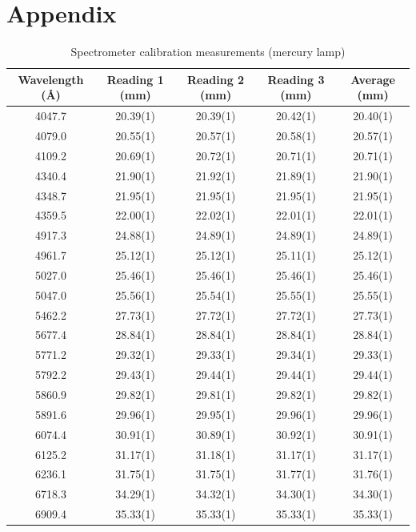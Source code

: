 \documentclass[12pt]{article}
\begin{document}
\section*{Appendix}
\begin{table}[htbp]
\centering
\caption{Spectrometer calibration measurements (mercury lamp)}
\begin{tabular}{c|c|c|c|c}
\hline
\hline
Wavelength (\AA) & Reading 1 (mm) & Reading 2 (mm) & Reading 3 (mm) & Average (mm) \\
\hline\hline
4047.7 & 20.39(1) & 20.39(1) & 20.42(1) & 20.40(1) \\
4079.0 & 20.55(1) & 20.57(1) & 20.58(1) & 20.57(1) \\
4109.2 & 20.69(1) & 20.72(1) & 20.71(1) & 20.71(1) \\
4340.4 & 21.90(1) & 21.92(1) & 21.89(1) & 21.90(1) \\
4348.7 & 21.95(1) & 21.95(1) & 21.95(1) & 21.95(1) \\
4359.5 & 22.00(1) & 22.02(1) & 22.01(1) & 22.01(1) \\
4917.3 & 24.88(1) & 24.89(1) & 24.89(1) & 24.89(1) \\
4961.7 & 25.12(1) & 25.12(1) & 25.11(1) & 25.12(1) \\
5027.0 & 25.46(1) & 25.46(1) & 25.46(1) & 25.46(1) \\
5047.0 & 25.56(1) & 25.54(1) & 25.55(1) & 25.55(1) \\
5462.2 & 27.73(1) & 27.72(1) & 27.72(1) & 27.73(1) \\
5677.4 & 28.84(1) & 28.84(1) & 28.84(1) & 28.84(1) \\
5771.2 & 29.32(1) & 29.33(1) & 29.34(1) & 29.33(1) \\
5792.2 & 29.43(1) & 29.44(1) & 29.44(1) & 29.44(1) \\
5860.9 & 29.82(1) & 29.81(1) & 29.82(1) & 29.82(1) \\
5891.6 & 29.96(1) & 29.95(1) & 29.96(1) & 29.96(1) \\
6074.4 & 30.91(1) & 30.89(1) & 30.92(1) & 30.91(1) \\
6125.2 & 31.17(1) & 31.18(1) & 31.17(1) & 31.17(1) \\
6236.1 & 31.75(1) & 31.75(1) & 31.77(1) & 31.76(1) \\
6718.3 & 34.29(1) & 34.32(1) & 34.30(1) & 34.30(1) \\
6909.4 & 35.33(1) & 35.33(1) & 35.33(1) & 35.33(1) \\
\hline\hline
\end{tabular}
\label{calibration}
\end{table}
\end{document}
